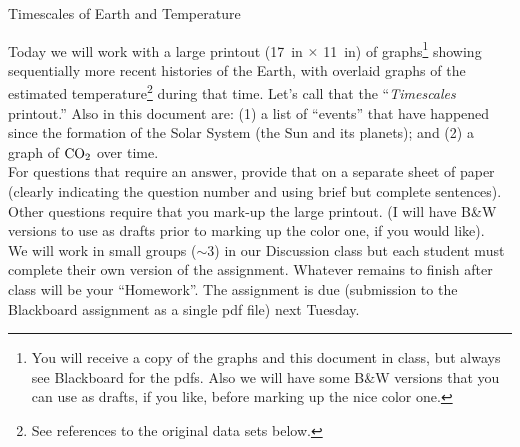 \documentclass[12pt]{article}
\begin{document}
\begin{center}
{\Large Timescales of Earth and Temperature}
\end{center}

\noindent Today we will work with a large printout (17~in $\times$ 11~in) of graphs\footnote{You will receive a copy of the graphs and this document in class, but always see Blackboard for the pdfs. Also we will have some B\&W versions that you can use as drafts, if you like, before marking up the nice color one.} showing sequentially more recent histories of the Earth, with overlaid graphs of the estimated temperature\footnote{See references to the original data sets below.} during that time. Let's call that the ``{\em Timescales} printout.'' Also in this document are: (1) a  list of ``events'' that have happened since the formation of the Solar System (the Sun and its planets); and (2) a graph of ${\rm CO}_2$ over time.  \\

\noindent For questions that require an answer, provide that on a separate sheet of paper (clearly indicating the question number and using brief but complete sentences). Other questions require that you mark-up the large printout. (I will have B\&W versions to use as drafts prior to marking up the color one, if you would like). \\

\noindent We will work in small groups ($\sim$3) in our Discussion class but each student must complete their own version of the assignment.  Whatever remains to finish after class will be your ``Homework''.  The assignment is due (submission to the Blackboard assignment as a single pdf file) next Tuesday. 
\end{document}
